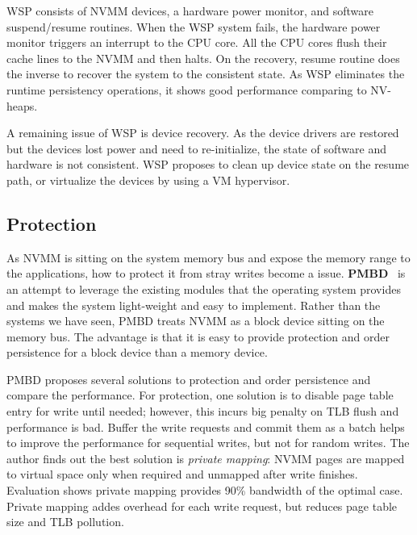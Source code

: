 WSP consists of NVMM devices, a hardware power monitor, and software suspend/resume routines. When the WSP system fails, the hardware power monitor triggers
an interrupt to the CPU core. All the CPU cores flush their cache lines to the 
NVMM and then halts. On the recovery, resume routine does the inverse to recover
the system to the consistent state. As WSP eliminates the runtime persistency
operations, it shows good performance comparing to NV-heaps.

A remaining issue of WSP is device recovery. As the device drivers are restored
but the devices lost power and need to re-initialize, the state of software
and hardware is not consistent. WSP proposes to clean up device state on
the resume path, or virtualize the devices by using a VM hypervisor.


\subsection{Protection} 
\label{sec:protection}

As NVMM is sitting on the system memory bus and expose the memory range
to the applications, how to protect it from stray writes become a issue.
\textbf{PMBD}~\cite{PMBD}
 is an attempt to leverage the existing modules that the 
operating system provides and makes the system light-weight and easy to
implement. Rather than the systems we have seen,
PMBD treats NVMM as a block device sitting on the memory bus. The advantage
is that it is easy to provide protection and order persistence for
a block device than a memory device.

PMBD proposes several solutions to protection and order persistence and
compare the performance. For protection, one solution is to disable page
table entry for write until needed; however, this incurs big penalty on
TLB flush and performance is bad. Buffer the write requests and commit
them as a batch helps to improve the performance for sequential writes,
but not for random writes. The author finds out the best solution is 
\emph{private mapping}: NVMM pages are mapped to virtual space only when
required and unmapped after write finishes. Evaluation shows private
mapping provides 90\% bandwidth of the optimal case. Private mapping
addes overhead for each write request, but reduces page table size and
TLB pollution.


